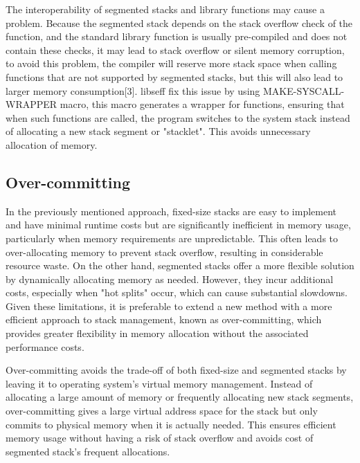 \documentclass[logo,bsc,singlespacing,parskip]{infthesis}
\begin{document}
\medskip

The interoperability of segmented stacks and library functions may cause a problem. Because the segmented stack depends on the stack overflow check of the function, and the standard library function is usually pre-compiled and does not contain these checks, it may lead to stack overflow or silent memory corruption, to avoid this problem, the compiler will reserve more stack space when calling functions that are not supported by segmented stacks, but this will also lead to larger memory consumption[3]. libseff fix this issue by using MAKE-SYSCALL-WRAPPER macro, this macro generates a wrapper for functions, ensuring that when such functions are called, the program switches to the system stack instead of allocating a new stack segment or "stacklet". This avoids unnecessary allocation of memory.



\medskip

\subsection{Over-committing}

In the previously mentioned approach, fixed-size stacks are easy to implement and have minimal runtime costs but are significantly inefficient in memory usage, particularly when memory requirements are unpredictable. This often leads to over-allocating memory to prevent stack overflow, resulting in considerable resource waste. On the other hand, segmented stacks offer a more flexible solution by dynamically allocating memory as needed. However, they incur additional costs, especially when "hot splits" occur, which can cause substantial slowdowns. Given these limitations, it is preferable to extend a new method with a more efficient approach to stack management, known as over-committing, which provides greater flexibility in memory allocation without the associated performance costs.

\medskip

Over-committing avoids the trade-off of both fixed-size and segmented stacks by leaving it to operating system's virtual memory management. Instead of allocating a large amount of memory or frequently allocating new stack segments, over-committing gives a large virtual address space for the stack but only commits to physical memory when it is actually needed. This ensures efficient memory usage without having a risk of stack overflow and avoids cost of segmented stack's frequent allocations.  
\end{document}
